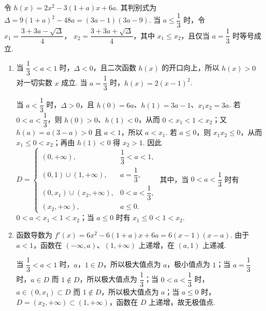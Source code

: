 \begin{solution}
令 \(h(x)=2x^2-3(1+a)x+6a\). 其判别式为
\(\Delta=9(1+a)^2-48a=(3a-1)(3a-9)\). 当 \(a\leqslant\dfrac{1}{3}\) 时，令
\(x_{1}=\dfrac{3+3a-\sqrt{\Delta}}{4}\)，
\(x_{2}=\dfrac{3+3a+\sqrt{\Delta}}{4}\)，其中 \(x_1\leqslant x_2\)，且仅当 \(a=\dfrac{1}{3}\) 时等号成立.
\begin{enumerate}
\item
当 \(\dfrac{1}{3}<a<1\) 时，\(\Delta<0\)，且二次函数 \(h(x)\) 的开口向上，所以 \(h(x)>0\) 对一切实数 \(x\) 成立. 当 \(a=\dfrac{1}{3}\) 时，\(h(x)=2(x-1)^2\).

当 \(a<\dfrac{1}{3}\) 时，\(\Delta>0\)，且 \(h(0)=6a\)、\(h(1)=3a-1\)、\(x_1x_2=3a\). 若 \(0<a<\dfrac{1}{3}\)，则 \(h(0)>0\)、\(h(1)<0\)，从而 \(0<x_1<1<x_2\)；又 \(h(a)=a(3-a)>0\) 且 \(a<1\)，所以 \(a<x_1\). 若 \(a\leqslant0\)，则 \(x_1x_2\leqslant0\)，从而 \(x_1\leqslant0<x_2\)；再由 \(h(1)<0\) 得 \(x_2>1\). 因此
\(D=\begin{cases}
(0,+\infty),&\dfrac{1}{3}<a<1,\\
(0,1)\cup(1,+\infty),&a=\dfrac{1}{3},\\
(0,x_{1})\cup(x_{2},+\infty),&0<a<\dfrac{1}{3},\\
(x_{2},+\infty),&a\leqslant0.
\end{cases}\)
其中，当 \(0<a<\dfrac{1}{3}\) 时有 \(0<a<x_1<1<x_2\)；当 \(a\leqslant0\) 时有 \(x_1\leqslant0<1<x_2\).
\item 函数导数为 \(f'(x)=6x^2-6(1+a)x+6a=6(x-1)(x-a)\). 由于 \(a<1\)，函数在 \((-\infty,a)\)、\((1,+\infty)\) 上递增，在 \((a,1)\) 上递减.

当 \(\dfrac{1}{3}<a<1\) 时，\(a\)，\(1\in D\)，所以极大值点为 \(a\)，极小值点为 \(1\)；当 \(a=\dfrac{1}{3}\) 时，\(a\in D\) 而 \(1\notin D\)，所以极大值点为 \(\dfrac{1}{3}\)；当 \(0<a<\dfrac{1}{3}\) 时，\(a\in(0,x_1)\subset D\) 而 \(1\notin D\)，所以极大值点为 \(a\)；当 \(a\leqslant0\) 时，\(D=(x_2,+\infty)\subset(1,+\infty)\)，函数在 \(D\) 上递增，故无极值点.
\end{enumerate}
\end{solution}
